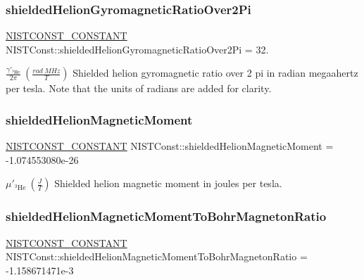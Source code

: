 \subsubsection{\texorpdfstring{shielded\+Helion\+Gyromagnetic\+Ratio\+Over2\+Pi}{shieldedHelionGyromagneticRatioOver2Pi}}
{\footnotesize\ttfamily \mbox{\hyperlink{group___n_i_s_t_const-_macros_ga2b0fc1d7452373f816175dd86ce26729}{N\+I\+S\+T\+C\+O\+N\+S\+T\+\_\+\+C\+O\+N\+S\+T\+A\+NT}} N\+I\+S\+T\+Const\+::shielded\+Helion\+Gyromagnetic\+Ratio\+Over2\+Pi = 32.}

$\frac{\gamma'_{^3\textrm{He}}}{2 \pi} \ (\frac{rad\ MHz}{T})$ Shielded helion gyromagnetic ratio over 2 pi in radian megaahertz per tesla. Note that the units of radians are added for clarity. \mbox{\label{group___n_i_s_t_const-_helion_ga425da6143b23f32e91a4bed842e2f6d5}} 
\subsubsection{\texorpdfstring{shielded\+Helion\+Magnetic\+Moment}{shieldedHelionMagneticMoment}}
{\footnotesize\ttfamily \mbox{\hyperlink{group___n_i_s_t_const-_macros_ga2b0fc1d7452373f816175dd86ce26729}{N\+I\+S\+T\+C\+O\+N\+S\+T\+\_\+\+C\+O\+N\+S\+T\+A\+NT}} N\+I\+S\+T\+Const\+::shielded\+Helion\+Magnetic\+Moment = -\/1.\+074553080e-\/26}

$\mu'_{^3\textrm{He}} \ (\frac{J}{T})$ Shielded helion magnetic moment in joules per tesla. \mbox{\label{group___n_i_s_t_const-_helion_ga7b496ea143c3603e453977b9db2da2d7}} 
\subsubsection{\texorpdfstring{shielded\+Helion\+Magnetic\+Moment\+To\+Bohr\+Magneton\+Ratio}{shieldedHelionMagneticMomentToBohrMagnetonRatio}}
{\footnotesize\ttfamily \mbox{\hyperlink{group___n_i_s_t_const-_macros_ga2b0fc1d7452373f816175dd86ce26729}{N\+I\+S\+T\+C\+O\+N\+S\+T\+\_\+\+C\+O\+N\+S\+T\+A\+NT}} N\+I\+S\+T\+Const\+::shielded\+Helion\+Magnetic\+Moment\+To\+Bohr\+Magneton\+Ratio = -\/1.\+158671471e-\/3}

